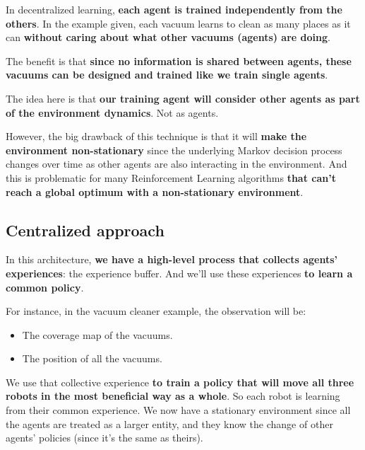 \documentclass[11pt,a4paper]{article}
\begin{document}
In decentralized learning, \textbf{each agent is trained independently from the others}. In the example given, each vacuum learns to clean as many places as it can \textbf{without caring about what other vacuums (agents) are doing}.

The benefit is that \textbf{since no information is shared between agents, these vacuums can be designed and trained like we train single agents}.

The idea here is that \textbf{our training agent will consider other agents as part of the environment dynamics}. Not as agents.

However, the big drawback of this technique is that it will \textbf{make the environment non-stationary} since the underlying Markov decision process changes over time as other agents are also interacting in the environment. And this is problematic for many Reinforcement Learning algorithms \textbf{that can't reach a global optimum with a non-stationary environment}.

\subsection{Centralized approach}\label{centralized-approach}


In this architecture, \textbf{we have a high-level process that collects agents' experiences}: the experience buffer. And we'll use these experiences \textbf{to learn a common policy}.

For instance, in the vacuum cleaner example, the observation will be:

\begin{itemize}
\tightlist
\item
  The coverage map of the vacuums.
\item
  The position of all the vacuums.
\end{itemize}

We use that collective experience \textbf{to train a policy that will move all three robots in the most beneficial way as a whole}. So each robot is learning from their common experience. We now have a stationary environment since all the agents are treated as a larger entity, and they know the change of other agents' policies (since it's the same as theirs).
\end{document}
